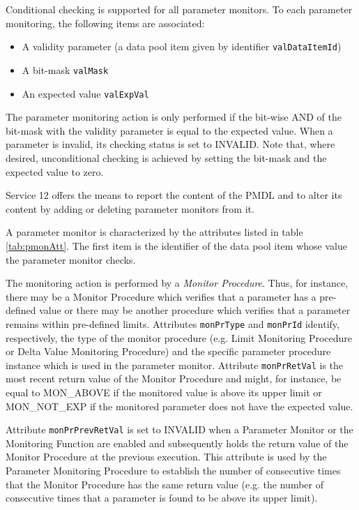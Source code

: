 \documentclass{pnp_article}
\begin{document}
Conditional checking is supported for all parameter monitors. To each parameter monitoring, the following items are associated: 

\begin{itemize}
\item A validity parameter (a data pool item given by identifier \texttt{valDataItemId})
\item A bit-mask \texttt{valMask}
\item An expected value \texttt{valExpVal}
\end{itemize}

The parameter monitoring action is only performed if the bit-wise AND of the bit-mask with the validity parameter is equal to the expected value. When a parameter is invalid, its checking status is set to INVALID. Note that, where desired, unconditional checking is achieved by setting the bit-mask and the expected value to zero.

Service 12 offers the means to report the content of the PMDL and to alter its content by adding or deleting parameter monitors from it.

A parameter monitor is characterized by the attributes listed in table \ref{tab:pmonAtt}. The first item is the identifier of the data pool item whose value the parameter monitor checks. 

The monitoring action is performed by a \textit{Monitor Procedure}. Thus, for instance, there may be a Monitor Procedure which verifies that a parameter has a pre-defined value or there may be another procedure which verifies that a parameter remains within pre-defined limits. Attributes \texttt{monPrType} and \texttt{monPrId} identify, respectively, the type of the monitor procedure (e.g. Limit Monitoring Procedure or Delta Value Monitoring Procedure) and the specific parameter procedure instance which is used in the parameter monitor. Attribute \texttt{monPrRetVal} is the most recent return value of the Monitor Procedure and might, for instance, be equal to MON\_ABOVE if the monitored value is above its upper limit or MON\_NOT\_EXP if the monitored parameter does not have the expected value.

Attribute \texttt{monPrPrevRetVal} is set to INVALID when a Parameter Monitor or the Monitoring Function are enabled and subsequently holds the return value of the Monitor Procedure at the previous execution. This attribute is used by the Parameter Monitoring Procedure to establish the number of consecutive times that the Monitor Procedure has the same return value (e.g. the number of consecutive times that a parameter is found to be above its upper limit).
\end{document}
